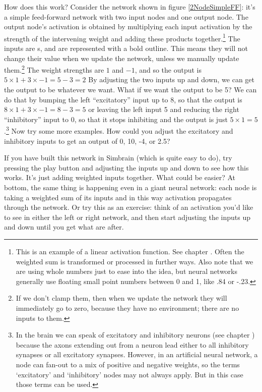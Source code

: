 How does this work? Consider the network shown in figure \ref{2NodeSimpleFF}: it's a simple feed-forward network with two input nodes and one output node. The output node's activation is obtained by multiplying each input activation by the strength of the intervening weight and adding these products together.\footnote{This is an example of a linear activation function. See chapter . Often the weighted sum is transformed or processed in further ways. Also note that we are using whole numbers just to ease into the idea, but neural networks generally use floating small point numbers between 0 and 1, like .84 or -.23.}  The inputs are s, and are represented with a bold outline. This means they will not change their value when we update the network, unless we manually update them.\footnote{If we don't clamp them, then when we update the network they will immediately go to zero, because they have no environment; there are no inputs to them.} The weight strengths are $1$ and $-1$, and so the output is $5 \times 1 + 3 \times -1 = 5 - 3 = 2$ By adjusting the two inputs up and down, we can get the output to be whatever we want. What if we want the output to be 5? We can do that by bumping the left  ``excitatory'' input up to 8, so that the output is $8 \times 1 + 3 \times -1 = 8 - 3 = 5$ or leaving the left input 5 and reducing the right ``inhibitory'' input to 0, so that it stops inhibiting and the output is just $5 \times 1 = 5$.\footnote{In the brain we can speak of excitatory and inhibitory neurons (see chapter ) because the axons extending out from a neuron lead either to all inhibitory synapses or all excitatory synapses. However, in an artificial neural network, a node can fan-out to a mix of positive and negative weights, so the terms `excitatory' and `inhibitory' nodes may not always apply. But in this case those terms can be used.} Now try some more examples. How could you adjust the excitatory and inhibitory inputs to get an output of 0, 10, -4, or 2.5?

If you have built this network in Simbrain (which is quite easy to do), try pressing the play button and adjusting the inputs up and down to see how this works. It's just adding weighted inputs together. What could be easier?  At bottom, the same thing is happening even in a giant neural network: each node is taking a weighted sum of its inputs and in this way activation propagates through the network. Or try this as an exercise: think of an activation you'd like to see in either the left or right network, and then start adjusting the inputs up and down until you get what are after.

